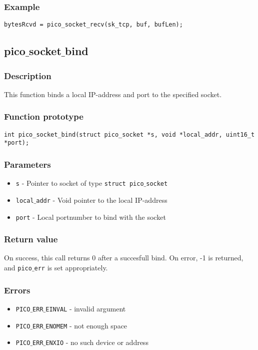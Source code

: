 \subsubsection*{Example}
\begin{verbatim}
bytesRcvd = pico_socket_recv(sk_tcp, buf, bufLen);
\end{verbatim}


\subsection{pico$\_$socket$\_$bind}

\subsubsection*{Description}
This function binds a local IP-address and port to the specified socket.

\subsubsection*{Function prototype}
\begin{verbatim}
int pico_socket_bind(struct pico_socket *s, void *local_addr, uint16_t *port);
\end{verbatim}


\subsubsection*{Parameters}
\begin{itemize}[noitemsep]
\item \texttt{s} - Pointer to socket of type \texttt{struct pico$\_$socket}
\item \texttt{local$\_$addr} - Void pointer to the local IP-address
\item \texttt{port} - Local portnumber to bind with the socket
\end{itemize}

\subsubsection*{Return value}
On success, this call returns 0 after a succesfull bind.
On error, -1 is returned, and \texttt{pico$\_$err} is set appropriately.

\subsubsection*{Errors}
\begin{itemize}[noitemsep]
\item \texttt{PICO$\_$ERR$\_$EINVAL} - invalid argument
\item \texttt{PICO$\_$ERR$\_$ENOMEM} - not enough space
\item \texttt{PICO$\_$ERR$\_$ENXIO} - no such device or address
\end{itemize}

